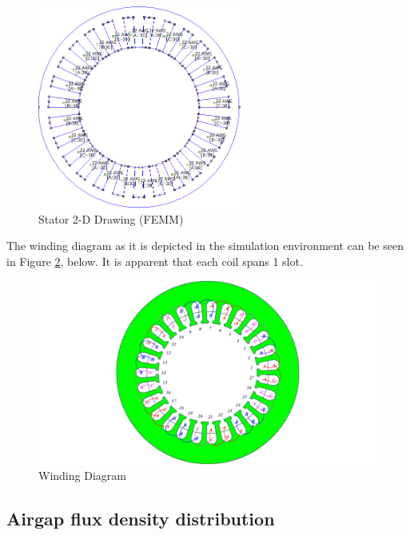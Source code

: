\documentclass[a4paper, 11pt]{article}
\begin{document}
\begin{figure}[h!]
    \centering
	\begin{center}
		\includegraphics[width=0.6\textwidth]{Q3_2D_FEMM.png}
	\end{center}
	\caption{Stator 2-D Drawing (FEMM)}
	\label{fig:Q3_2D_FEMM}
\end{figure}

The winding diagram as it is depicted in the simulation environment can be seen in Figure \ref{fig:Q3_windingDiagram}, below. It is apparent that each coil spans 1 slot.

\begin{figure}[h!]
    \centering
	\begin{center}
		\includegraphics[width=1.0\textwidth]{Q3_winding_diagram.png}
	\end{center}
	\caption{Winding Diagram}
	\label{fig:Q3_windingDiagram}
\end{figure}

\subsection{Airgap flux density distribution}
\end{document}
